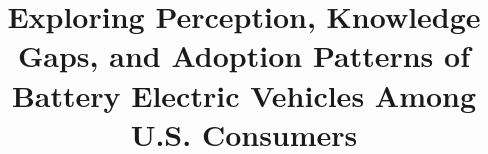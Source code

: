 \documentclass[a4paper,fleqn]{cas-sc}   %
\begin{document}
\let\WriteBookmarks\relax
\def\floatpagepagefraction{1}
\def\textpagefraction{.001}
\shorttitle{}


\title [mode = title]{Exploring Perception, Knowledge Gaps, and Adoption Patterns of Battery Electric Vehicles Among U.S. Consumers}                      







                
                


\end{document}
